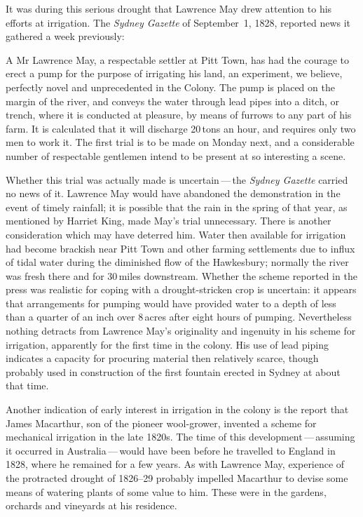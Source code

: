 It was during this serious drought that Lawrence May drew attention to
his efforts at irrigation.  The \textsl{Sydney Gaz\-ette} of
September~1, 1828, reported news it gathered a week previously:
\begin{Quote}
	A Mr Lawrence May, a respectable settler at Pitt Town, has had
	the courage to erect a pump for the purpose of irrigating his
	land, an experiment, we believe, perfectly novel and
	unprecedented in the Colony. The pump is placed on the margin
	of the river, and conveys the water through lead pipes into a
	ditch, or trench, where it is conducted at pleasure, by means
	of furrows to any part of his farm. It is calculated that it
	will discharge 20\,tons an hour, and requires only two men to
	work it. The first trial is to be made on Monday next, and a
	considerable number of respectable gentlemen intend to be
	present at so interesting a scene.
\end{Quote}

Whether this trial was actually made is uncertain\,---\,the
\textsl{Sydney Gaz\-ette} carried no news of it.  Lawrence May would
have abandoned the demonstration in the event of timely rainfall; it
is possible that the rain in the spring of that year, as mentioned by
Harriet King, made May's trial unnecessary.  There is another
consideration which may have deterred him.  Water then available for
irrigation had become brackish near Pitt Town and other farming
settlements due to influx of tidal water during the diminished flow of
the Hawkesbury; normally the river was fresh there and for 30\,miles
downstream.  Whether the
scheme reported in the press was realistic for coping with a
drought-stricken crop is uncertain: it appears that arrangements for
pumping would have provided water to a depth of less than a quarter of
an inch over 8\,acres after eight hours of pumping.  Nevertheless
nothing detracts from Lawrence May's originality and ingenuity in his
scheme for irrigation, apparently for the first time in the colony.
His use of lead piping indicates a capacity for procuring material
then relatively scarce, though probably used in construction of the
first fountain erected in Sydney at about that time.

Another indication of early interest in irrigation in the colony is
the report that James Mac\-ar\-th\-ur, son of the
pioneer wool-grower, invented a scheme for mechanical irrigation in
the late 1820s.  The time of this development\,---\,assuming it occurred
in Australia\,---\,would have been before he travelled to England in
1828, where he remained for a few years.  As with Lawrence May,
experience of the protracted drought of 1826--29 probably impelled
Macarthur to devise some means of watering plants of some value to
him.  These were in the gardens, orchards and vineyards at his
residence.

